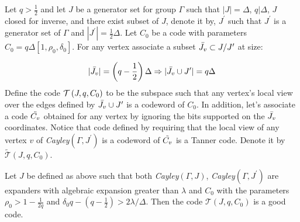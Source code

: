\begin{definition}\label{testtaner} Let $q > \frac{1}{2}$ and let $J$ be a generator set for group $\Gamma$ such that $|J| = \Delta$, $q | \Delta $, $J$ closed for inverse, and there exist subset of $J$, denote it by, $J^{\prime}$ such that $J^{\prime}$ is a generator set of $\Gamma$ and $|J^{\prime}| = \frac{1}{2}\Delta$. Let $C_{0}$ be a code with parameters $C_{0} = q\Delta \left[1, \rho_{0}, \delta_{0}\right]$. For any vertex associate a subset $\bar{J_{v}} \subset J/J^{\prime}$ at size: 

  \begin{equation*}
    \begin{split}
      |\bar{J_{v}}| = \left( q - \frac{1}{2} \right)\Delta \Rightarrow |\bar{J_{v}} \cup J^{\prime}| = q\Delta
    \end{split}
  \end{equation*}
  Define the code $\mathcal{T}\left(J, q , C_{0}\right)$ to be the subspace such that any vertex's local view over the edges defined by $\bar{J_{v}} \cup J^{\prime}$ is a codeword of $C_{0}$. In addition, let's associate a code $\tilde{C_{v}}$ obtained for any vertex by ignoring the bits supported on the $\bar{J_{v}}$ coordinates. Notice that code defined by requiring that the local view of any vertex $v$ of \emph{Cayley}$\left(\Gamma, J^{\prime} \right)$ is a codeword of $\tilde{C_{v}}$ is a Tanner code. Denote it by $ \tilde{\mathcal{T}}\left(J, q ,C_{0}\right)$.   
\end{definition}
\begin{claim} Let $J$ be defined as above such that both \emph{Cayley}$\left( \Gamma, J \right)$, \emph{Cayley}$\left( \Gamma, J^{\prime} \right)$ are expanders with algebraic expansion greater than $\lambda$ and $C_0$ with the parameters $\rho_{0} > 1 - \frac{1}{2q}$ and $ \delta_{0}q - \left( q - \frac{1}{2} \right) > 2\lambda/\Delta$. Then the code $\mathcal{T}\left(J, q ,C_{0}\right)$ is a good code.\end{claim}
